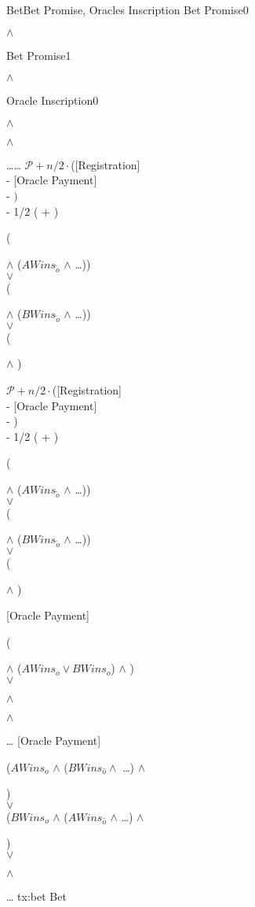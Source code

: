 \transaction
    {Bet}{Bet Promise, Oracles Inscription}
    {Bet Promise}{0}{\signature{A} $\wedge$ \signature{B}}
    {Bet Promise}{1}{\signature{A} $\wedge$ \signature{B}}
    {Oracle Inscription}{0}
        {\signature{A} $\wedge$ \signature{B} $\wedge$ \signature{O}}
        {\ldots}{\ldots}{}
    \stopinputs
    {$\mathcal{P} + n/2 \cdot $([Registration] \\
            - [Oracle Payment] \\
            - $)$ \\
            - 1/2 ( + )}
        {(\signature{A} $\wedge$ ($AWins_{\tilde{o}}$ $\wedge$ \ldots {})) \\
                          $\vee$ \\
         (\signature{B} $\wedge$ ($BWins_{\tilde{o}}$ $\wedge$ \ldots {})) \\
                                    $\vee$ \\
         (\signature{A} $\wedge$ )}
    {$\mathcal{P} + n/2 \cdot $([Registration] \\
            - [Oracle Payment] \\
            - ) \\
            - 1/2 ( + )}
        {(\signature{A} $\wedge$ ($AWins_{\tilde{o}}$ $\wedge$ \ldots {})) \\
                          $\vee$ \\
         (\signature{B} $\wedge$ ($BWins_{\tilde{o}}$ $\wedge$ \ldots {})) \\
                                    $\vee$ \\
         (\signature{B} $\wedge$ )}
    {[Oracle Payment]}{(\signature{o} $\wedge$ ($AWins_o \vee BWins_o$) %
                       $\wedge$ ) \\
                       $\vee$  \\
                       \signature{A} $\wedge$ \signature{B} $\wedge$ %
                       }
    {\ldots}{}
    {[Oracle Payment]}{($AWins_o$ $\wedge$ ($BWins_{\hat{o}} \wedge$ %
                         \dots) $\wedge$ \signature{B}) \\
                       $\vee$ \\
                       ($BWins_o$ $\wedge$ ($AWins_{\hat{o}}$ %
                        $\wedge$  \dots) $\wedge$ \signature{A}) \\
                       $\vee$ \\
                        \signature{o} $\wedge$ }
    {\ldots}{}
    \stopoutputs
    {tx:bet}
    {Bet}

